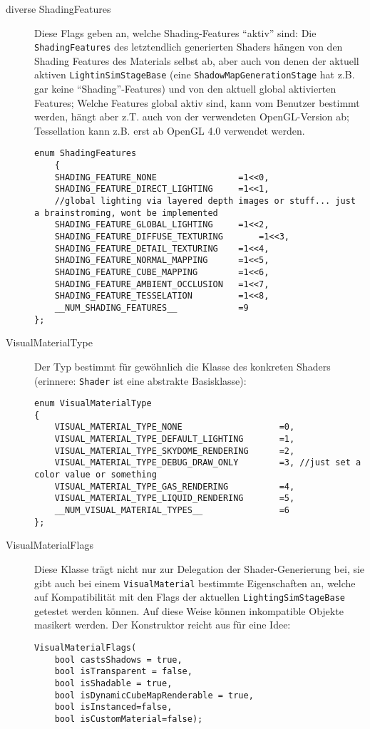\begin{description}
		
		
		\item[diverse ShadingFeatures] 
		Diese Flags geben an, welche Shading-Features "`aktiv"' sind: Die \lstinline|ShadingFeatures| des letztendlich
		generierten Shaders hängen von den Shading Features des Materials selbst ab, aber auch von denen der 
		aktuell aktiven \lstinline|LightinSimStageBase| (eine \lstinline|ShadowMapGenerationStage| hat z.B. gar keine
		"`Shading"'-Features) und von den aktuell global aktivierten Features; Welche Features global aktiv sind, kann
		vom Benutzer bestimmt werden, hängt aber z.T. auch von der verwendeten OpenGL-Version ab; Tessellation kann z.B. 
		erst ab OpenGL 4.0 verwendet werden.
		
		\begin{lstlisting}
enum ShadingFeatures
	{
	SHADING_FEATURE_NONE				=1<<0,
	SHADING_FEATURE_DIRECT_LIGHTING		=1<<1,
	//global lighting via layered depth images or stuff... just a brainstroming, wont be implemented
	SHADING_FEATURE_GLOBAL_LIGHTING		=1<<2,
	SHADING_FEATURE_DIFFUSE_TEXTURING		=1<<3,
	SHADING_FEATURE_DETAIL_TEXTURING	=1<<4,
	SHADING_FEATURE_NORMAL_MAPPING		=1<<5,
	SHADING_FEATURE_CUBE_MAPPING		=1<<6,
	SHADING_FEATURE_AMBIENT_OCCLUSION	=1<<7,
	SHADING_FEATURE_TESSELATION			=1<<8,
	__NUM_SHADING_FEATURES__			=9
};
	\end{lstlisting}
		
		
	\item[VisualMaterialType]
	Der Typ bestimmt für gewöhnlich die Klasse des konkreten Shaders (erinnere: \lstinline|Shader| ist eine abstrakte 
	Basisklasse):	
	\begin{lstlisting}
enum VisualMaterialType
{
	VISUAL_MATERIAL_TYPE_NONE					=0,
	VISUAL_MATERIAL_TYPE_DEFAULT_LIGHTING  		=1,
	VISUAL_MATERIAL_TYPE_SKYDOME_RENDERING		=2,
	VISUAL_MATERIAL_TYPE_DEBUG_DRAW_ONLY		=3,	//just set a color value or something
	VISUAL_MATERIAL_TYPE_GAS_RENDERING			=4,
	VISUAL_MATERIAL_TYPE_LIQUID_RENDERING		=5,
	__NUM_VISUAL_MATERIAL_TYPES__				=6
};
	\end{lstlisting}
	
	
	\item[VisualMaterialFlags]
	Diese Klasse trägt nicht nur zur Delegation der Shader-Generierung bei, sie
	gibt auch bei einem \lstinline|VisualMaterial| bestimmte Eigenschaften an,
	welche auf Kompatibilität mit den Flags der aktuellen \lstinline|LightingSimStageBase| getestet werden können.
	Auf diese Weise können inkompatible Objekte masikert werden.
	Der Konstruktor reicht aus für eine Idee:
	\begin{lstlisting}
VisualMaterialFlags(
	bool castsShadows = true,
	bool isTransparent = false,
	bool isShadable = true,
	bool isDynamicCubeMapRenderable = true,
	bool isInstanced=false,
	bool isCustomMaterial=false);
	\end{lstlisting}
		
	\end{description}
	
